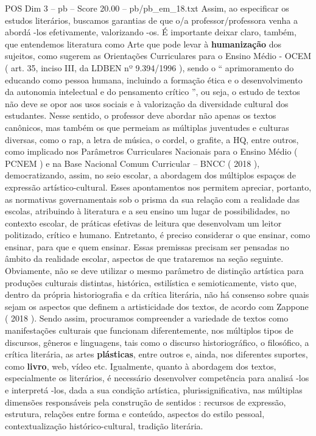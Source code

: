 \begin{textsample}{POS Dim 3 – pb – Score 20.00 – pb/pb\_em\_18.txt}
Assim, ao especificar os estudos literários, buscamos garantias de que o/a professor/professora venha a abordá -los efetivamente, valorizando -os.
É importante deixar claro, também, que entendemos literatura como Arte que pode levar à \textbf{humanização} dos sujeitos, como sugerem as Orientações Curriculares para o Ensino Médio - OCEM ( art. 35, inciso III, da LDBEN nº 9.394/1996 ), sendo o “ aprimoramento do educando como pessoa humana, incluindo a formação ética e o desenvolvimento da autonomia intelectual e do pensamento crítico ”, ou seja, o estudo de textos não deve se opor aos usos sociais e à valorização da diversidade cultural dos estudantes.
Nesse sentido, o professor deve abordar não apenas os textos canônicos, mas também os que permeiam as múltiplas juventudes e culturas diversas, como o rap, a letra de música, o cordel, o grafite, a HQ, entre outros, como implicado nos Parâmetros Curriculares Nacionais para o Ensino Médio ( PCNEM ) e na Base Nacional Comum Curricular – BNCC ( 2018 ), democratizando, assim, no seio escolar, a abordagem dos múltiplos espaços de expressão artístico-cultural.
Esses apontamentos nos permitem apreciar, portanto, as normativas governamentais sob o prisma da sua relação com a realidade das escolas, atribuindo à literatura e a seu ensino um lugar de possibilidades, no contexto escolar, de práticas efetivas de leitura que desenvolvam um leitor politizado, crítico e humano.
Entretanto, é preciso considerar o que ensinar, como ensinar, para que e quem ensinar.
Essas premissas precisam ser pensadas no âmbito da realidade escolar, aspectos de que trataremos na seção seguinte.
Obviamente, não se deve utilizar o mesmo parâmetro de distinção artística para produções culturais distintas, histórica, estilística e semioticamente, visto que, dentro da própria historiografia e da crítica literária, não há consenso sobre quais sejam os aspectos que definem a artisticidade dos textos, de acordo com Zappone ( 2018 ).
Sendo assim, procuramos compreender a variedade de textos como manifestações culturais que funcionam diferentemente, nos múltiplos tipos de discursos, gêneros e linguagens, tais como o discurso historiográfico, o filosófico, a crítica literária, as artes \textbf{plásticas}, entre outros e, ainda, nos diferentes suportes, como \textbf{livro}, web, vídeo etc.
Igualmente, quanto à abordagem dos textos, especialmente os literários, é necessário desenvolver competência para analisá -los e interpretá -los, dada a sua condição artística, plurissignificativa, nas múltiplas dimensões responsáveis pela construção de sentidos : recursos de expressão, estrutura, relações entre forma e conteúdo, aspectos do estilo pessoal, contextualização histórico-cultural, tradição literária.

\end{textsample}
